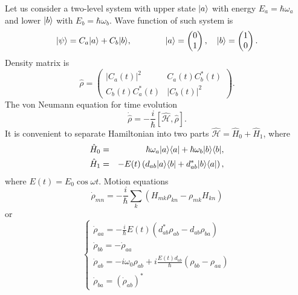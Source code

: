 Let us consider a two-level system with upper state $\lvert a\rangle$ with energy $E_a = \hbar \omega_a$ and lower $\lvert b\rangle$ with $E_b = \hbar \omega_b$. Wave function of such system is
\begin{equation}
	\lvert\psi\rangle = C_a \lvert a\rangle + C_b \lvert b\rangle, \qquad \qquad 
	\lvert a\rangle =
	\begin{pmatrix}
		0\\1
	\end{pmatrix}, \quad
	\lvert b\rangle =
	\begin{pmatrix}
	1\\0
	\end{pmatrix}.
\end{equation}
Density matrix is
\begin{equation}
	\hat{\rho} = 
	\begin{pmatrix}
	\left| C_a (t) \right|^2 & C_a (t) C_b^*(t) \\
	C_b (t) C_a^*(t) & \left| C_b (t) \right|^2
	\end{pmatrix}.
\end{equation}
The von Neumann equation for time evolution
\begin{equation}
	\dot{\hat{\rho}} = - \frac{i}{\hbar} \left[ \hat{\mathscr{H}}, \hat{\rho} \right].
	\label{eq:vonN}
\end{equation}
It is convenient to separate Hamiltonian into two parts $\hat{\mathscr{H}} = \hat{H}_0 + \hat{H}_1$, where
\begin{eqnarray}
	\hat{H}_0 &=& \hbar \omega_a \lvert a\rangle \langle a\rvert + \hbar \omega_b \lvert b\rangle \langle b\rvert , \\
	\hat{H}_1 &=& -E(t) \left( d_{ab} \lvert a\rangle \langle b\rvert + d^*_{ab} \lvert b\rangle \langle a\rvert \right),
\end{eqnarray}
where $E(t) = E_0 \cos \omega t$. Motion equations
\begin{equation}
	\dot{\rho}_{mn} = - \frac{i}{\hbar} \sum_k \left( H_{mk} \rho_{kn} - \rho_{mk} H_{kn} \right)
\end{equation}
or
\begin{equation}
	\begin{cases}
		\dot{\rho}_{aa} = - \frac{i}{\hbar} E(t) \left( d^*_{ab} \rho_{ab} - d_{ab} \rho_{ba} \right) \\
		\dot{\rho}_{bb} = - \dot{\rho}_{aa} \\
		\dot{\rho}_{ab} = - i \omega_0 \rho_{ab} + i \frac{E(t) d_{ab}}{\hbar} \left( \rho_{bb} - \rho_{aa} \right) \\
		\dot{\rho}_{ba} = \left( \dot{\rho}_{ab} \right)^*
	\end{cases}
	\label{eq:dens_system}
\end{equation}
